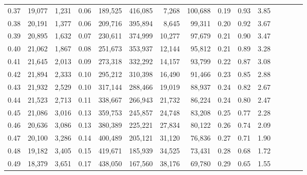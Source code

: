 \begin{tabular}{rrrcrrrrrrrrrrr}
0.37 &  19,077 &  1,231 &                                       0.06 &  189,525 &  416,085 &    7,268 &  100,688 &  0.19 &  0.93 &                         3.85 \\
0.38 &  20,191 &  1,377 &                                       0.06 &  209,716 &  395,894 &    8,645 &   99,311 &  0.20 &  0.92 &                         3.67 \\
0.39 &  20,895 &  1,632 &                                       0.07 &  230,611 &  374,999 &   10,277 &   97,679 &  0.21 &  0.90 &                         3.47 \\
0.40 &  21,062 &  1,867 &                                       0.08 &  251,673 &  353,937 &   12,144 &   95,812 &  0.21 &  0.89 &                         3.28 \\
0.41 &  21,645 &  2,013 &                                       0.09 &  273,318 &  332,292 &   14,157 &   93,799 &  0.22 &  0.87 &                         3.08 \\
0.42 &  21,894 &  2,333 &                                       0.10 &  295,212 &  310,398 &   16,490 &   91,466 &  0.23 &  0.85 &                         2.88 \\
0.43 &  21,932 &  2,529 &                                       0.10 &  317,144 &  288,466 &   19,019 &   88,937 &  0.24 &  0.82 &                         2.67 \\
0.44 &  21,523 &  2,713 &                                       0.11 &  338,667 &  266,943 &   21,732 &   86,224 &  0.24 &  0.80 &                         2.47 \\
0.45 &  21,086 &  3,016 &                                       0.13 &  359,753 &  245,857 &   24,748 &   83,208 &  0.25 &  0.77 &                         2.28 \\
0.46 &  20,636 &  3,086 &                                       0.13 &  380,389 &  225,221 &   27,834 &   80,122 &  0.26 &  0.74 &                         2.09 \\
0.47 &  20,100 &  3,286 &                                       0.14 &  400,489 &  205,121 &   31,120 &   76,836 &  0.27 &  0.71 &                         1.90 \\
0.48 &  19,182 &  3,405 &                                       0.15 &  419,671 &  185,939 &   34,525 &   73,431 &  0.28 &  0.68 &                         1.72 \\
0.49 &  18,379 &  3,651 &                                       0.17 &  438,050 &  167,560 &   38,176 &   69,780 &  0.29 &  0.65 &                         1.55 \\

\end{tabular}
